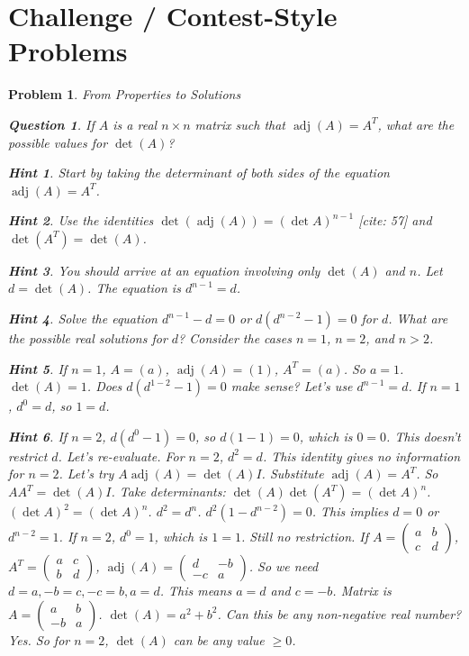 \documentclass[12pt]{article}
\newtheorem{problem}{Problem}[section]
\newtheorem{question}{Question}[problem]
\theoremstyle{definition}
\newtheorem{hint}{Hint}[question]
\newcommand{\adj}{\operatorname{adj}}
\newcommand{\detm}{\operatorname{det}}
\begin{document}
\section{Challenge / Contest-Style Problems}

\begin{problem}{From Properties to Solutions}
    \begin{question}
        If $A$ is a real $n \times n$ matrix such that $\adj(A) = A^T$, what are the possible values for $\detm(A)$?
    \end{question}
    
        \begin{hint}
            Start by taking the determinant of both sides of the equation $\adj(A) = A^T$.
        \end{hint}
        \begin{hint}
            Use the identities $\detm(\adj(A)) = (\detm A)^{n-1}$ [cite: 57] and $\detm(A^T) = \detm(A)$.
        \end{hint}
        \begin{hint}
            You should arrive at an equation involving only $\detm(A)$ and $n$. Let $d = \detm(A)$. The equation is $d^{n-1} = d$.
        \end{hint}
        \begin{hint}
            Solve the equation $d^{n-1} - d = 0$ or $d(d^{n-2}-1) = 0$ for $d$. What are the possible real solutions for $d$? Consider the cases $n=1$, $n=2$, and $n > 2$.
        \end{hint}
         \begin{hint}
             If $n=1$, $A=(a)$, $\adj(A)=(1)$, $A^T=(a)$. So $a=1$. $\detm(A)=1$. Does $d(d^{1-2}-1)=0$ make sense? Let's use $d^{n-1}=d$. If $n=1$, $d^0=d$, so $1=d$.
         \end{hint}
         \begin{hint}
             If $n=2$, $d(d^0-1)=0$, so $d(1-1)=0$, which is $0=0$. This doesn't restrict $d$. Let's re-evaluate. For $n=2$, $d^2=d$. This identity gives no information for $n=2$.
             Let's try $A\adj(A) = \detm(A)I$. Substitute $\adj(A)=A^T$. So $A A^T = \detm(A)I$. Take determinants: $\detm(A)\detm(A^T) = (\detm A)^n$. $(\detm A)^2 = (\detm A)^n$. $d^2 = d^n$. $d^2(1-d^{n-2})=0$.
             This implies $d=0$ or $d^{n-2}=1$.
             If $n=2$, $d^0=1$, which is $1=1$. Still no restriction. If $A=\begin{pmatrix} a&b\\c&d \end{pmatrix}$, $A^T=\begin{pmatrix} a&c\\b&d \end{pmatrix}$, $\adj(A)=\begin{pmatrix} d&-b\\-c&a \end{pmatrix}$. So we need $d=a, -b=c, -c=b, a=d$. This means $a=d$ and $c=-b$. Matrix is $A=\begin{pmatrix} a&b\\-b&a \end{pmatrix}$. $\detm(A)=a^2+b^2$. Can this be any non-negative real number? Yes. So for $n=2$, $\detm(A)$ can be any value $\ge 0$.

\end{hint}
\end{problem}
\end{document}
